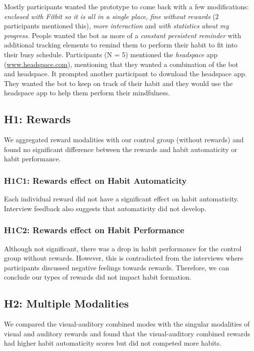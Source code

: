 \documentclass{scaffold/sigchi}
\begin{document}
Mostly participants wanted the prototype to come back with a few modifications: \textit{enclosed with Fitbit so it is all in a single place}, \textit{fine without rewards} (2 participants mentioned this), \textit{more interaction} and \textit{with statistics about my progress}. People wanted the bot as more of a \textit{constant persistent reminder} with additional tracking elements to remind them to perform their habit to fit into their busy schedule. Participants (N = 5) mentioned the \textit{headspace} app (\url{www.headspace.com}), mentioning that they wanted a combination of the bot and headspace. It prompted another participant to download the headspace app. They wanted the bot to keep on track of their habit and they would use the headspace app to help them perform their mindfulness.

\subsection{H1: Rewards}
We aggregated reward modalities with our control group (without rewards) and found no significant difference between the rewards and habit automaticity or habit performance. 

\subsubsection{H1C1: Rewards effect on Habit Automaticity}
Each individual reward did not have a significant effect on habit automaticity. Interview feedback also suggests that automaticity did not develop.

\subsubsection{H1C2: Rewards effect on Habit Performance}
Although not significant, there was a drop in habit performance for the control group without rewards. However, this is contradicted from the interviews where participants discussed negative feelings towards rewards. Therefore, we can conclude our types of rewards did not impact habit formation. 

\subsection{H2: Multiple Modalities}
We compared the visual-auditory combined modes with the singular modalities of visual and auditory rewards and found that the visual-auditory combined rewards had higher habit automaticity scores but did not competed more habits.
\end{document}
